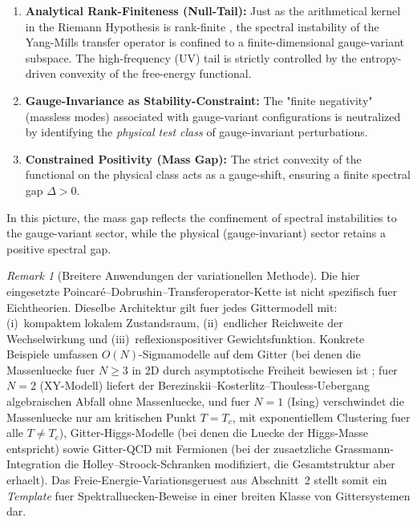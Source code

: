\documentclass[12pt,a4paper]{article}
\theoremstyle{definition}
\theoremstyle{plain}
\theoremstyle{remark}
\newtheorem{remark}[definition]{Remark}
\begin{document}
\begin{enumerate}[label=\alph*)]
    \item \textbf{Analytical Rank-Finiteness (Null-Tail):} Just as the arithmetical kernel in the Riemann Hypothesis is rank-finite \cite{GeigerRH2026c}, the spectral instability of the Yang-Mills transfer operator is confined to a finite-dimensional gauge-variant subspace. The high-frequency (UV) tail is strictly controlled by the entropy-driven convexity of the free-energy functional.
    \item \textbf{Gauge-Invariance as Stability-Constraint:} The "finite negativity" (massless modes) associated with gauge-variant configurations is neutralized by identifying the \emph{physical test class} of gauge-invariant perturbations.
    \item \textbf{Constrained Positivity (Mass Gap):} The strict convexity of the functional on the physical class acts as a gauge-shift, ensuring a finite spectral gap $\Delta > 0$. 
\end{enumerate}

In this picture, the mass gap reflects the confinement of spectral instabilities to the gauge-variant sector, while the physical (gauge-invariant) sector retains a positive spectral gap.

\begin{remark}[Breitere Anwendungen der variationellen Methode]
Die hier eingesetzte Poincar\'e--Dobrushin--Transferoperator-Kette ist nicht spezifisch fuer Eichtheorien. Dieselbe Architektur gilt fuer jedes Gittermodell mit: (i)~kompaktem lokalem Zustandsraum, (ii)~endlicher Reichweite der Wechselwirkung und (iii)~reflexionspositiver Gewichtsfunktion. Konkrete Beispiele umfassen $O(N)$-Sigmamodelle auf dem Gitter (bei denen die Massenluecke fuer $N \geq 3$ in 2D durch asymptotische Freiheit bewiesen ist \cite{Polyakov1975}; fuer $N = 2$ (XY-Modell) liefert der Berezinskii--Kosterlitz--Thouless-Uebergang algebraischen Abfall ohne Massenluecke, und fuer $N = 1$ (Ising) verschwindet die Massenluecke nur am kritischen Punkt $T = T_c$, mit exponentiellem Clustering fuer alle $T \neq T_c$), Gitter-Higgs-Modelle (bei denen die Luecke der Higgs-Masse entspricht) sowie Gitter-QCD mit Fermionen (bei der zusaetzliche Grassmann-Integration die Holley--Stroock-Schranken modifiziert, die Gesamtstruktur aber erhaelt). Das Freie-Energie-Variationsgeruest aus Abschnitt~2 stellt somit ein \emph{Template} fuer Spektralluecken-Beweise in einer breiten Klasse von Gittersystemen dar.
\end{remark}
\end{document}

